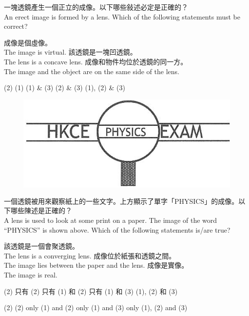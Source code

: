 \documentclass[beamer=true]{standalone}
\begin{document}
\begin{eg}
    一塊透鏡產生一個正立的成像。以下哪些敍述必定是正確的？\\An erect image is formed by a lens. Which of the following statements must be correct?
    \begin{statements}[before-skip=0pt,after-skip = 0pt]
        \task 成像是個虛像。\\The image is virtual.
        \task 該透鏡是一塊凹透鏡。\\The lens is a concave lens.
        \task 成像和物件均位於透鏡的同一方。\\The image and the object are on the same side of the lens.
    \end{statements}
    \begin{tasks}(2)
        \task (1)
        \task (1) \& (3)
        \task (2) \& (3)
        \task (1), (2) \& (3)
    \end{tasks}
\end{eg}

\begin{eg}
    \begin{figure}
        \centering
        \includegraphics[width=0.5\linewidth]{../../assets/x8neu983eu23.png}


    \end{figure}
    一個透鏡被用來觀察紙上的一些文字。上方顯示了單字「PHYSICS」的成像。以下哪些陳述是正確的？\\A lens is used to look at some print on a paper. The image of the word ``PHYSICS'' is shown above. Which of the following statements is/are true?

\end{eg}
\begin{eg}
    \begin{statements}[before-skip=0pt,after-skip = 0pt]
        \task 該透鏡是一個會聚透鏡。\\The lens is a converging lens.
        \task 成像位於紙張和透鏡之間。\\The image lies between the paper and the lens.
        \task 成像是實像。\\The image is real.
    \end{statements}
    \begin{tasks}(2)
        \task 只有 (2)
        \task 只有 (1) 和 (2)
        \task 只有 (1) 和 (3)
        \task (1), (2) 和 (3)
    \end{tasks}
    \begin{tasks}(2)
        \task (2) only
        \task (1) and (2) only
        \task (1) and (3) only
        \task (1), (2) and (3)
    \end{tasks}
\end{eg}
\end{document}

